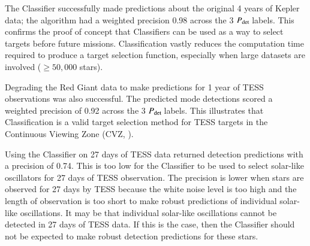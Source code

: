 \documentclass[a4paper,fleqn,usenatbib,useAMS]{mnras}
\newcommand{\kep}{\ensuremath{Kepler}\:}
\newcommand{\pdet}{\ensuremath{P_{\rm det}\:}}
\begin{document}
The Classifier successfully made predictions about the original 4 years of Kepler data; the algorithm had a weighted precision 0.98 across the 3 \pdet labels. This confirms the proof of concept that Classifiers can be used as a way to select targets before future missions. Classification vastly reduces the computation time required to produce a target selection function, especially when large datasets are involved ($\geq50,000$ stars).

Degrading the Red Giant data to make predictions for 1 year of TESS observations was also successful. The predicted mode detections scored a weighted precision of 0.92 across the 3 \pdet labels. This illustrates that Classification is a valid target selection method for TESS targets in the Continuous Viewing Zone (CVZ, \citep{ricker_transiting_2014}).

Using the Classifier on 27 days of TESS data returned detection predictions with a precision of 0.74. This is too low for the Classifier to be used to select solar-like oscillators for 27 days of TESS observation. The precision is lower when stars are observed for 27 days by TESS because the white noise level is too high and the length of observation is too short to make robust predictions of individual solar-like oscillations. It may be that individual solar-like oscillations cannot be detected in 27 days of TESS data. If this is the case, then the Classifier should not be expected to make robust detection predictions for these stars.











\bsp
\label{lastpage}
\end{document}
